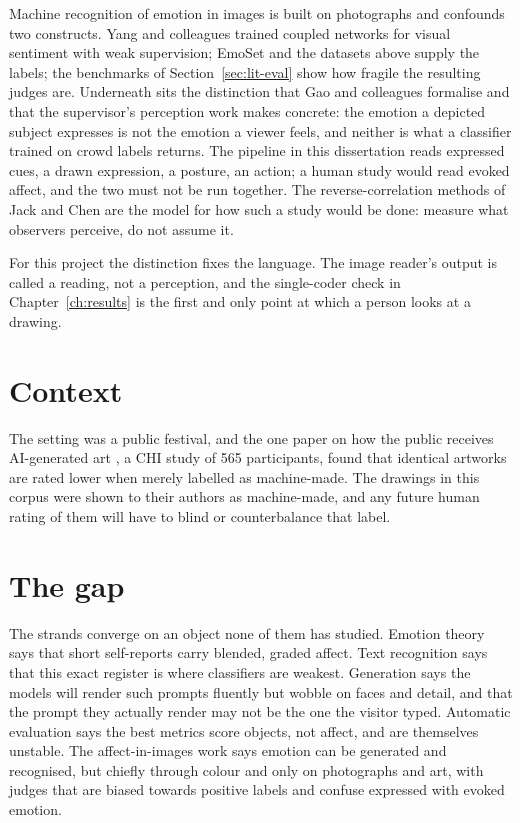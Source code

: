 Machine recognition of emotion in images is built on photographs and confounds two constructs. Yang and colleagues \cite{yang2018weakly} trained coupled networks for visual sentiment with weak supervision; EmoSet and the datasets above supply the labels; the benchmarks of Section~\ref{sec:lit-eval} show how fragile the resulting judges are. Underneath sits the distinction that Gao and colleagues \cite{gao2025eemo} formalise and that the supervisor's perception work makes concrete: the emotion a depicted subject expresses is not the emotion a viewer feels, and neither is what a classifier trained on crowd labels returns. The pipeline in this dissertation reads expressed cues, a drawn expression, a posture, an action; a human study would read evoked affect, and the two must not be run together. The reverse-correlation methods of Jack and Chen \cite{jack2012facial, chen2018distinct, chen2020building, chen2024cultural} are the model for how such a study would be done: measure what observers perceive, do not assume it.

For this project the distinction fixes the language. The image reader's output is called a reading, not a perception, and the single-coder check in Chapter~\ref{ch:results} is the first and only point at which a person looks at a drawing.

\section{Context}
\label{sec:lit-context}

The setting was a public festival, and the one paper on how the public receives AI-generated art \cite{ragot2020ai}, a CHI study of 565 participants, found that identical artworks are rated lower when merely labelled as machine-made. The drawings in this corpus were shown to their authors as machine-made, and any future human rating of them will have to blind or counterbalance that label.

\section{The gap}
\label{sec:lit-gap}

The strands converge on an object none of them has studied. Emotion theory says that short self-reports carry blended, graded affect. Text recognition says that this exact register is where classifiers are weakest. Generation says the models will render such prompts fluently but wobble on faces and detail, and that the prompt they actually render may not be the one the visitor typed. Automatic evaluation says the best metrics score objects, not affect, and are themselves unstable. The affect-in-images work says emotion can be generated and recognised, but chiefly through colour and only on photographs and art, with judges that are biased towards positive labels and confuse expressed with evoked emotion.

